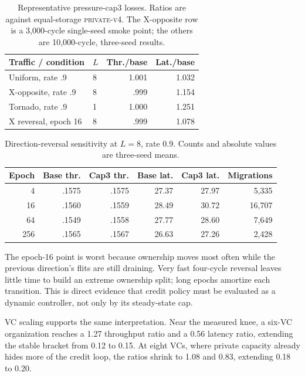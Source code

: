 \documentclass[10pt,twocolumn]{article}
\newcommand{\privatefour}{\textsc{private-v4}\xspace}
\begin{document}
\begin{table}[t]
\centering
\caption{Representative pressure-cap3 losses. Ratios are against equal-storage
\privatefour. The X-opposite row is a 3,000-cycle single-seed smoke point; the
others are 10,000-cycle, three-seed results.}
\label{tab:negative}
\scriptsize
\begin{tabular}{llrr}
\toprule
Traffic / condition & $L$ & Thr./base & Lat./base\\
\midrule
Uniform, rate .9 & 8 & 1.001 & 1.032\\
X-opposite, rate .9 & 8 & .999 & 1.154\\
Tornado, rate .9 & 1 & 1.000 & 1.251\\
X reversal, epoch 16 & 8 & .999 & 1.078\\
\bottomrule
\end{tabular}
\end{table}

\begin{table}[t]
\centering
\caption{Direction-reversal sensitivity at $L=8$, rate 0.9. Counts and
absolute values are three-seed means.}
\label{tab:reversal}
\scriptsize
\setlength{\tabcolsep}{3.4pt}
\begin{tabular}{rrrrrr}
\toprule
Epoch & Base thr. & Cap3 thr. & Base lat. & Cap3 lat. & Migrations\\
\midrule
4   & .1575 & .1575 & 27.37 & 27.97 & 5,335\\
16  & .1560 & .1559 & 28.49 & 30.72 & 16,707\\
64  & .1549 & .1558 & 27.77 & 28.60 & 7,649\\
256 & .1565 & .1567 & 26.63 & 27.26 & 2,428\\
\bottomrule
\end{tabular}
\end{table}

The epoch-16 point is worst because ownership moves most often while the
previous direction's flits are still draining. Very fast four-cycle reversal
leaves little time to build an extreme ownership split; long epochs amortize
each transition. This is direct evidence that credit policy must be evaluated
as a dynamic controller, not only by its steady-state cap.

VC scaling supports the same interpretation. Near the measured knee, a
six-VC organization reaches a 1.27 throughput ratio and a 0.56 latency ratio,
extending the stable bracket from 0.12 to 0.15. At eight VCs, where private
capacity already hides more of the credit loop, the ratios shrink to 1.08 and
0.83, extending 0.18 to 0.20.
\end{document}
